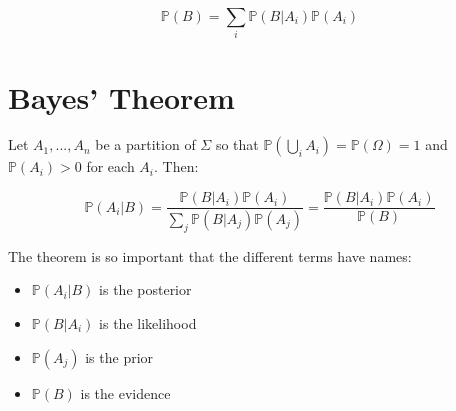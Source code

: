 \begin{equation}
\mathbb{P}(B) = \sum_i \mathbb{P}(B|A_i)\mathbb{P}(A_i) 
\end{equation} 

\section{Bayes' Theorem}
Let $A_1,...,A_n$ be a partition of $\Sigma$ so that $\mathbb{P}(\bigcup_i A_i) = \mathbb{P}(\Omega) = 1$ and $\mathbb{P}(A_i)>0$ for each $A_i$. Then:

\begin{equation}
\mathbb{P}(A_i|B) = \frac{\mathbb{P}(B|A_i)\mathbb{P}(A_i) }{\sum_j \mathbb{P}(B|A_j)\mathbb{P}(A_j) } = \frac{\mathbb{P}(B|A_i)\mathbb{P}(A_i) }{\mathbb{P}(B)}
\end{equation}

The theorem is so important that the different terms have names:

\begin{itemize}
\item $\mathbb{P}(A_i|B)$ is the posterior
\item $\mathbb{P}(B|A_i)$ is the likelihood 
\item $\mathbb{P}(A_j)$ is the prior
\item $\mathbb{P}(B)$ is the evidence
\end{itemize}

